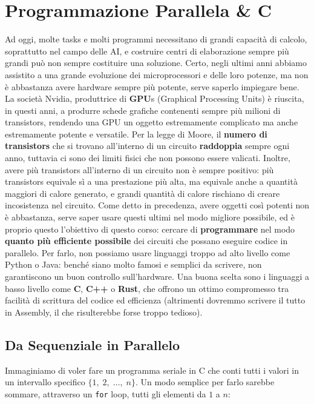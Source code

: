 \chapter{Programmazione Parallela \texorpdfstring{\&}{&} C}

Ad oggi, molte tasks e molti programmi necessitano di grandi capacità di calcolo, soprattutto nel campo delle AI, e costruire centri di elaborazione sempre più grandi può non sempre costituire una soluzione. Certo, negli ultimi anni abbiamo assistito a una grande evoluzione dei microprocessori e delle loro potenze, ma non è abbastanza avere hardware sempre più potente, serve saperlo impiegare bene.
\nl
La società Nvidia, produttrice di \textbf{GPU}s (Graphical Processing Units) è riuscita, in questi anni, a produrre schede grafiche contenenti sempre più milioni di transistors, rendendo una GPU un oggetto estremamente complicato ma anche estremamente potente e versatile. Per la legge di Moore, il \textbf{numero di transistors} che si trovano all'interno di un circuito \textbf{raddoppia} sempre ogni anno, tuttavia ci sono dei limiti fisici che non possono essere valicati. Inoltre, avere più transistors all'interno di un circuito non è sempre positivo: più transistors equivale sì a una prestazione più alta, ma equivale anche a quantità maggiori di calore generato, e grandi quantità di calore rischiano di creare incosistenza nel circuito.
\nl
Come detto in precedenza, avere oggetti così potenti non è abbastanza, serve saper usare questi ultimi nel modo migliore possibile, ed è proprio questo l'obiettivo di questo corso: cercare di \textbf{programmare} nel modo \textbf{quanto più efficiente possibile} dei circuiti che possano eseguire codice in parallelo.
\nl
Per farlo, non possiamo usare linguaggi troppo ad alto livello come Python o Java: benché siano molto famosi e semplici da scrivere, non garantiscono un buon controllo sull'hardware. Una buona scelta sono i linguaggi a basso livello come \textbf{C}, \textbf{C++} o \textbf{Rust}, che offrono un ottimo compromesso tra facilità di scrittura del codice ed efficienza (altrimenti dovremmo scrivere il tutto in Assembly, il che risulterebbe forse troppo tedioso).

\section{Da Sequenziale in Parallelo}

Immaginiamo di voler fare un programma seriale in C che conti tutti i valori in un intervallo specifico $\{ 1, \; 2, \; \dots, \; n\}$. Un modo semplice per farlo sarebbe sommare, attraverso un \verb|for| loop, tutti gli elementi da $1$ a $n$:

